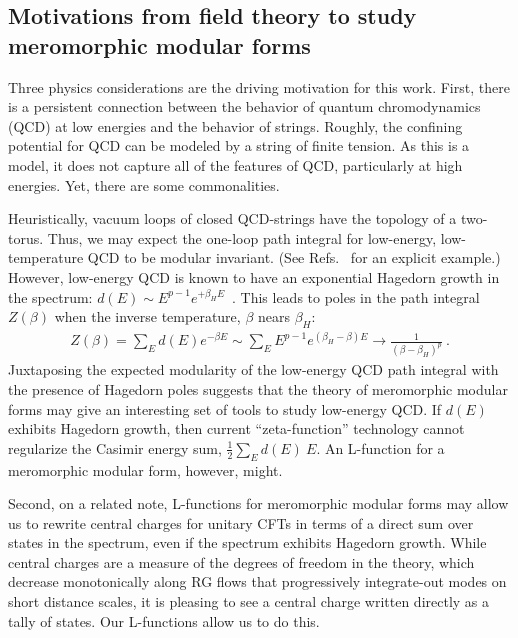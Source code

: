 \documentclass[11pt,a4paper]{article}
\begin{document}
\subsection{Motivations from field theory to study meromorphic modular forms}

Three physics considerations are the driving motivation for this work. First, there is a persistent connection between the behavior of quantum chromodynamics (QCD) at low energies and the behavior of strings. Roughly, the confining potential for QCD can be modeled by a string of finite tension. As this is a model, it does not capture all of the features of QCD, particularly at high energies. Yet, there are some commonalities. 

Heuristically, vacuum loops of closed QCD-strings have the topology of a two-torus. Thus, we may expect the one-loop path integral for low-energy, low-temperature QCD to be modular invariant. (See Refs.~\cite{09-S1S3, 10-2d4d1, 11-2d4d2} for an explicit example.) However, low-energy QCD is known to have an exponential Hagedorn growth in the spectrum: $d(E) \sim E^{p-1} e^{+\beta_H E}$~\cite{12-Hagedorn1, 13-Hagedorn2}. This leads to poles in the path integral $Z(\beta)$ when the inverse temperature, $\beta$ nears $\beta_H$: 
\begin{align}
Z(\beta) = \sum_E d(E) e^{-\beta E} \sim \sum_E E^{p-1} e^{(\beta_H-\beta)E}\to \frac{1}{(\beta-\beta_H)^p}~.
\end{align}
Juxtaposing the expected modularity of the low-energy QCD path integral with the presence of Hagedorn poles suggests that the theory of meromorphic modular forms may give an interesting set of tools to study low-energy QCD. If $d(E)$ exhibits Hagedorn growth, then current ``zeta-function'' technology cannot regularize the Casimir energy sum, $\tfrac12\sum_E d(E)~E$. An L-function for a meromorphic modular form, however, might.

Second, on a related note, L-functions for meromorphic modular forms may allow us to rewrite central charges for unitary CFTs in terms of a direct sum over states in the spectrum, even if the spectrum exhibits Hagedorn growth. While central charges are a measure of the degrees of freedom in the theory, which decrease monotonically along RG flows that progressively integrate-out modes on short distance scales, it is pleasing to see a central charge written directly as a tally of states. Our L-functions allow us to do this.
\end{document}
